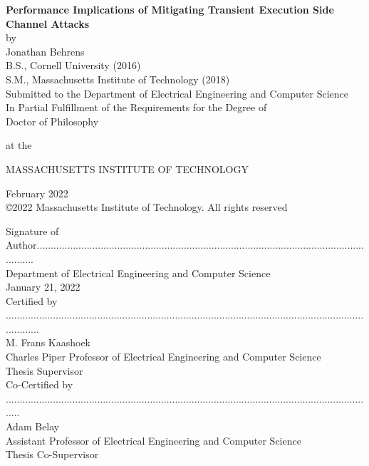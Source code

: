 \begin{titlepage}

    \centering
    \onehalfspacing
    {\large \bf Performance Implications of Mitigating Transient Execution Side Channel Attacks} \\[1\baselineskip]
    by \\[0.25\baselineskip]
    {\large Jonathan Behrens} \\[1\baselineskip]

    B.S., Cornell University (2016) \\
    S.M., Massachusetts Institute of Technology (2018) \\[1\baselineskip]

    Submitted to the Department of Electrical Engineering and Computer Science \\
    In Partial Fulfillment of the Requirements for the Degree of\\[0.5\baselineskip]

    Doctor of Philosophy

    at the 

    MASSACHUSETTS INSTITUTE OF TECHNOLOGY

    February 2022 \\[0.5\baselineskip]

    \copyright 2022 Massachusetts Institute of Technology. All rights reserved \\[0.25in]

    \singlespacing
    \raggedleft
    \small

    Signature of Author................................................................................................................................ \\
    Department of Electrical Engineering and Computer Science \\
    January 21, 2022 \\[1\baselineskip]

    Certified by ............................................................................................................................................. \\
    M. Frans Kaashoek \\
    Charles Piper Professor of Electrical Engineering and Computer Science \\
    Thesis Supervisor \\[1\baselineskip]

    Co-Certified by ...................................................................................................................................... \\
    Adam Belay \\
    Assistant Professor of Electrical Engineering and Computer Science \\
    Thesis Co-Supervisor \\[1\baselineskip]


\end{titlepage}
